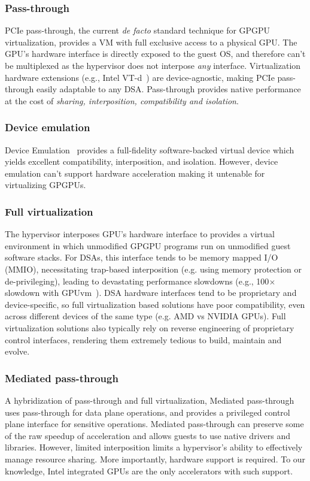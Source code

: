 \subsubsection{Pass-through}
PCIe pass-through, the current \emph{de facto} standard technique for GPGPU
virtualization, provides a VM with full exclusive access to a physical GPU.
The GPU's hardware interface is directly exposed to the guest OS, and
therefore can't be multiplexed as the hypervisor does not interpose \emph{any}
interface. Virtualization hardware extensions (e.g., Intel VT-d~\cite{
abramson2006intel}) are device-agnostic, making PCIe pass-through easily
adaptable to any DSA. Pass-through provides native performance at the cost of
\emph{sharing, interposition, compatibility and isolation}.

\subsubsection{Device emulation}
Device Emulation~\cite{bellard2005qemu} provides a full-fidelity
software-backed virtual device which yields excellent compatibility,
interposition, and isolation. However, device emulation can't support hardware
acceleration making it untenable for virtualizing GPGPUs.

\subsubsection{Full virtualization}
The hypervisor interposes GPU's hardware interface to provides a virtual
environment in which unmodified GPGPU programs run on unmodified guest
software stacks.
For DSAs, this interface tends to be memory mapped I/O (MMIO), necessitating
trap-based interposition (e.g. using memory protection or de-privileging),
leading to devastating performance slowdowns (e.g., 100$\times$ slowdown with
GPUvm~\cite{suzuki2014gpuvm,yu2017fullvirt}). DSA hardware interfaces tend to
be proprietary and device-specific, so full virtualization based solutions
have poor compatibility, even across different devices of the same type (e.g.
AMD vs NVIDIA GPUs). Full virtualization solutions also typically rely on
reverse engineering of proprietary control interfaces, rendering them
extremely tedious to build, maintain and evolve.

\subsubsection{Mediated pass-through}
A hybridization of pass-through and full virtualization, Mediated
pass-through~\cite{gVirt,mdev-mvme,vpio} uses pass-through for data plane
operations, and provides a privileged control plane interface for sensitive
operations. Mediated pass-through can preserve some of the raw speedup of
acceleration and allows guests to use native drivers and libraries.
However, limited interposition limits a hypervisor's ability to effectively
manage resource sharing. More importantly, hardware support is required. To
our knowledge, Intel integrated GPUs are the only accelerators with such
support.

